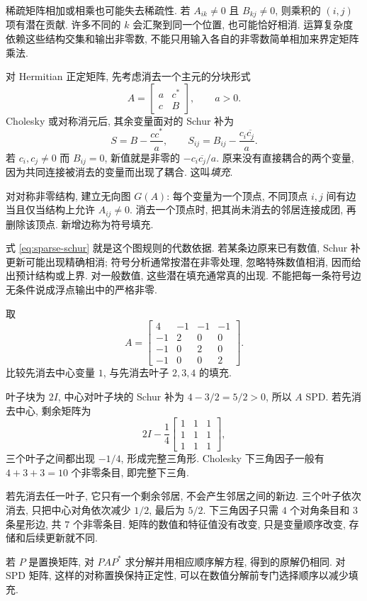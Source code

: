 稀疏矩阵相加或相乘也可能失去稀疏性. 若 $A_{ik}\ne0$ 且 $B_{kj}\ne0$, 则乘积的 $(i,j)$ 项有潜在贡献. 许多不同的 $k$ 会汇聚到同一个位置, 也可能恰好相消. 运算复杂度依赖这些结构交集和输出非零数, 不能只用输入各自的非零数简单相加来界定矩阵乘法.

对 Hermitian 正定矩阵, 先考虑消去一个主元的分块形式
\[
A=\begin{bmatrix}a&c^*\\c&B\end{bmatrix},\qquad a>0.
\]
Cholesky 或对称消元后, 其余变量面对的 Schur 补为
\begin{equation}\label{eq:sparse-schur}
S=B-\frac{cc^*}{a},\qquad S_{ij}=B_{ij}-\frac{c_i\overline{c_j}}a.
\end{equation}
若 $c_i,c_j\ne0$ 而 $B_{ij}=0$, 新值就是非零的 $-c_i\overline{c_j}/a$. 原来没有直接耦合的两个变量, 因为共同连接被消去的变量而出现了耦合. 这叫\emph{填充}.

\begin{definition}
对对称非零结构, 建立无向图 $G(A)$: 每个变量为一个顶点, 不同顶点 $i,j$ 间有边当且仅当结构上允许 $A_{ij}\ne0$. 消去一个顶点时, 把其尚未消去的邻居连接成团, 再删除该顶点. 新增边称为符号填充.
\end{definition}
式 \eqref{eq:sparse-schur} 就是这个图规则的代数依据. 若某条边原来已有数值, Schur 补更新可能出现精确相消; 符号分析通常按潜在非零处理, 忽略特殊数值相消, 因而给出预计结构或上界. 对一般数值, 这些潜在填充通常真的出现. 不能把每一条符号边无条件说成浮点输出中的严格非零.

\begin{example}\label{ex:sparse-star}
取
\[
A=\begin{bmatrix}
4&-1&-1&-1\\
-1&2&0&0\\
-1&0&2&0\\
-1&0&0&2
\end{bmatrix}.
\]
比较先消去中心变量 $1$, 与先消去叶子 $2,3,4$ 的填充.
\end{example}
\begin{solution}
叶子块为 $2I$, 中心对叶子块的 Schur 补为 $4-3/2=5/2>0$, 所以 $A$ SPD. 若先消去中心, 剩余矩阵为
\[
2I-\frac14\begin{bmatrix}1&1&1\\1&1&1\\1&1&1\end{bmatrix},
\]
三个叶子之间都出现 $-1/4$, 形成完整三角形. Cholesky 下三角因子一般有 $4+3+3=10$ 个非零条目, 即完整下三角.

若先消去任一叶子, 它只有一个剩余邻居, 不会产生邻居之间的新边. 三个叶子依次消去, 只把中心对角依次减少 $1/2$, 最后为 $5/2$. 下三角因子只需 $4$ 个对角条目和 $3$ 条星形边, 共 $7$ 个非零条目. 矩阵的数值和特征值没有改变, 只是变量顺序改变, 存储和后续更新就不同.
\end{solution}
若 $P$ 是置换矩阵, 对 $PAP^*$ 求分解并用相应顺序解方程, 得到的原解仍相同. 对 SPD 矩阵, 这样的对称置换保持正定性, 可以在数值分解前专门选择顺序以减少填充.

